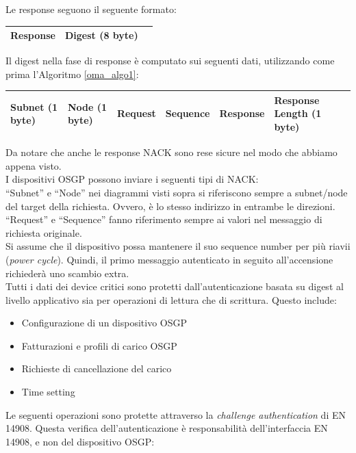 \newline
Le response seguono il seguente formato:
\begin{table}[!h]
	\centering
	\begin{tabular}{|l|l|l|}
		\hline
		Response & Digest (8 byte)\\ \hline
	\end{tabular}
\end{table}
\newline
Il digest nella fase di response è computato sui seguenti dati, utilizzando come prima l'Algoritmo \ref{oma_algo1}:
\begin{table}[!h]
	\centering
	\begin{tabular}{|l|l|l|l|l|l|}
		\hline
		Subnet (1 byte) & Node (1 byte) & Request & Sequence & Response & Response Length (1 byte)\\ \hline
	\end{tabular}
\end{table}
\newline
Da notare che anche le response NACK sono rese sicure nel modo che abbiamo appena visto.\\
I dispositivi OSGP possono inviare i seguenti tipi di NACK:\\
``Subnet'' e ``Node'' nei diagrammi visti sopra si riferiscono sempre a subnet/node del target della richiesta. Ovvero, è lo stesso indirizzo in entrambe le direzioni. ``Request'' e ``Sequence'' fanno riferimento sempre ai valori nel messaggio di richiesta originale.\\
Si assume che il dispositivo possa mantenere il suo sequence number per più riavii (\emph{power cycle}). Quindi, il primo messaggio autenticato in seguito all'accensione richiederà uno scambio extra.\\
Tutti i dati dei device critici sono protetti dall'autenticazione basata su digest al livello applicativo sia per operazioni di lettura che di scrittura. Questo include:\\
\begin{itemize}
	\item Configurazione di un dispositivo OSGP
	\item Fatturazioni e profili di carico OSGP
	\item Richieste di cancellazione del carico
	\item Time setting
\end{itemize}
Le seguenti operazioni sono protette attraverso la \textit{challenge authentication} di EN 14908. Questa verifica dell'autenticazione è responsabilità dell'interfaccia EN 14908, e non del dispositivo OSGP:
